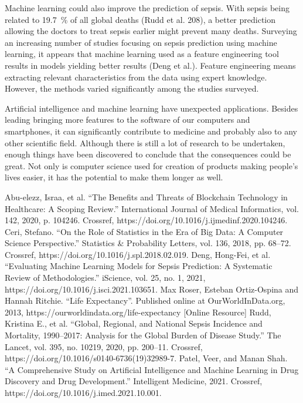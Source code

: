 \documentclass[a4paper,12pt]{article}
\begin{document}
Machine learning could also improve the prediction of sepsis. With sepsis being related to 19.7~\% of all global deaths (Rudd et al. 208), a better prediction allowing the doctors to treat sepsis earlier might prevent many deaths. Surveying an increasing number of studies focusing on sepsis prediction using machine learning, it appears that machine learning used as a feature engineering tool results in models yielding better results (Deng et al.). Feature engineering means extracting relevant characteristics from the data using expert knowledge. However, the methods varied significantly among the studies surveyed.

Artificial intelligence and machine learning have unexpected applications. Besides leading bringing more features to the software of our computers and smartphones, it can significantly contribute to medicine and probably also to any other scientific field. Although there is still a lot of research to be undertaken, enough things have been discovered to conclude that the consequences could be great. Not only is computer science used for creation of products making people's lives easier, it has the potential to make them longer as well.

\begin{thebibliography}{99}
 Abu-elezz, Israa, et al. ``The Benefits and Threats of Blockchain Technology in Healthcare: A Scoping Review.'' International Journal of Medical Informatics, vol. 142, 2020, p. 104246. Crossref, https://doi.org/10.1016/j.ijmedinf.2020.104246.
 Ceri, Stefano. ``On the Role of Statistics in the Era of Big Data: A Computer Science Perspective.'' Statistics \& Probability Letters, vol. 136, 2018, pp. 68–72. Crossref, https://doi.org/10.1016/j.spl.2018.02.019.
 Deng, Hong-Fei, et al. ``Evaluating Machine Learning Models for Sepsis Prediction: A Systematic Review of Methodologies.'' iScience, vol. 25, no. 1, 2021, https://doi.org/10.1016/j.isci.2021.103651.
 Max Roser, Esteban Ortiz-Ospina and Hannah Ritchie. ``Life Expectancy''. Published online at OurWorldInData.org, 2013, https://ourworldindata.org/life-expectancy [Online Resource]
 Rudd, Kristina E., et al. “Global, Regional, and National Sepsis Incidence and Mortality, 1990–2017: Analysis for the Global Burden of Disease Study.” The Lancet, vol. 395, no. 10219, 2020, pp. 200–11. Crossref, https://doi.org/10.1016/s0140-6736(19)32989-7.
 Patel, Veer, and Manan Shah. ``A Comprehensive Study on Artificial Intelligence and Machine Learning in Drug Discovery and Drug Development.'' Intelligent Medicine, 2021. Crossref, https://doi.org/10.1016/j.imed.2021.10.001.
\end{thebibliography}
\end{document}
